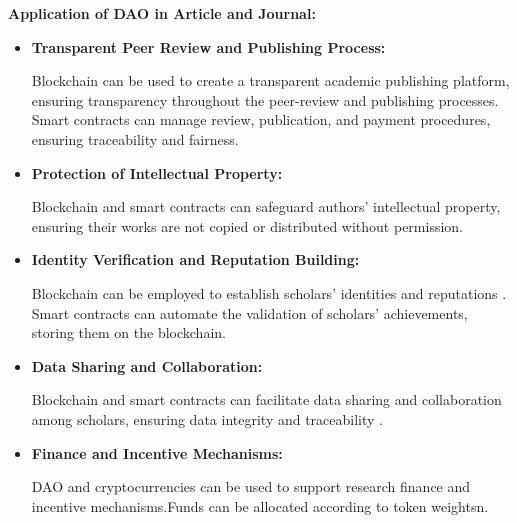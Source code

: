 \documentclass[lettersize,journal]{IEEEtran}
\begin{document}
\textbf{Application of DAO in Article and Journal:}

\begin{itemize}
  \item \textbf{Transparent Peer Review and Publishing Process:} 
  
  Blockchain can be used to create a transparent academic publishing platform, ensuring transparency throughout the peer-review and publishing processes.\cite{nakamoto2008bitcoin} Smart contracts can manage review, publication, and payment procedures, ensuring traceability and fairness.

  \item \textbf{Protection of Intellectual Property:}
  
  Blockchain and smart contracts can safeguard authors' intellectual property, ensuring their works are not copied or distributed without permission.
  
  \item \textbf{Identity Verification and Reputation Building:} 
  
  Blockchain can be employed to establish scholars' identities and reputations \cite{radziwill2018blockchain}. Smart contracts can automate the validation of scholars' achievements, storing them on the blockchain.
  
  \item \textbf{Data Sharing and Collaboration:} 
  
  Blockchain and smart contracts can facilitate data sharing and collaboration among scholars, ensuring data integrity and traceability \cite{praitheeshan2019security}.
  
  \item \textbf{Finance and Incentive Mechanisms:} 
  
  DAO and cryptocurrencies can be used to support research finance and incentive mechanisms.Funds can be allocated according to token weightsn.
\end{itemize}
\end{document}
